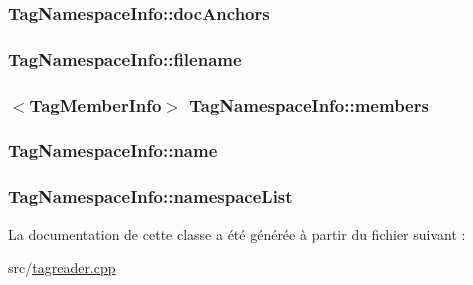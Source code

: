 \subsubsection[{doc\+Anchors}]{ Tag\+Namespace\+Info\+::doc\+Anchors}\label{class_tag_namespace_info_ac7b68ca719335aeac5ffa0115a0674ab}
\hypertarget{class_tag_namespace_info_ac8bd998116932e7629cecb3f6c88c911}{}
\subsubsection[{filename}]{ Tag\+Namespace\+Info\+::filename}\label{class_tag_namespace_info_ac8bd998116932e7629cecb3f6c88c911}
\hypertarget{class_tag_namespace_info_a987fc81066062fc21a0a9535a941c0db}{}
\subsubsection[{members}]{$<${\bf Tag\+Member\+Info}$>$ Tag\+Namespace\+Info\+::members}\label{class_tag_namespace_info_a987fc81066062fc21a0a9535a941c0db}
\hypertarget{class_tag_namespace_info_a3480b0fae0fddbecf92713cd425333a3}{}
\subsubsection[{name}]{ Tag\+Namespace\+Info\+::name}\label{class_tag_namespace_info_a3480b0fae0fddbecf92713cd425333a3}
\hypertarget{class_tag_namespace_info_a2543c5c9a6135a7ff8e4c9a3d8a66310}{}
\subsubsection[{namespace\+List}]{ Tag\+Namespace\+Info\+::namespace\+List}\label{class_tag_namespace_info_a2543c5c9a6135a7ff8e4c9a3d8a66310}


La documentation de cette classe a été générée à partir du fichier suivant \+:\begin{DoxyCompactItemize}
\item 
src/\hyperlink{tagreader_8cpp}{tagreader.\+cpp}\end{DoxyCompactItemize}
